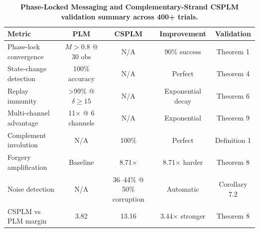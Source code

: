 \begin{table}[!htbp]
    \centering
    \caption{\textbf{Phase-Locked Messaging and Complementary-Strand CSPLM validation summary across 400+ trials.}}
    \begin{tabular}{lcccc}
    \toprule
    \textbf{Metric} & \textbf{PLM} & \textbf{CSPLM} & \textbf{Improvement} & \textbf{Validation} \\
    \midrule
    Phase-lock convergence & $M>0.8$ @ 30 obs & N/A & 90\% success & Theorem 1 \\
    State-change detection & 100\% accuracy & N/A & Perfect & Theorem 4 \\
    Replay immunity & >99\% @ $\delta \geq 15$ & N/A & Exponential decay & Theorem 6 \\
    Multi-channel advantage & 11× @ 6 channels & N/A & Exponential & Theorem 9 \\
    \midrule
    Complement involution & N/A & 100\% & Perfect & Definition 1 \\
    Forgery amplification & Baseline & 8.71× & 8.71× harder & Theorem 8 \\
    Noise detection & N/A & 36--44\% @ 50\% corruption & Automatic & Corollary 7.2 \\
    CSPLM vs PLM margin & 3.82 & 13.16 & 3.44× stronger & Theorem 8 \\
    \bottomrule
    \end{tabular}
    \label{tab:validation_summary}
\end{table}
